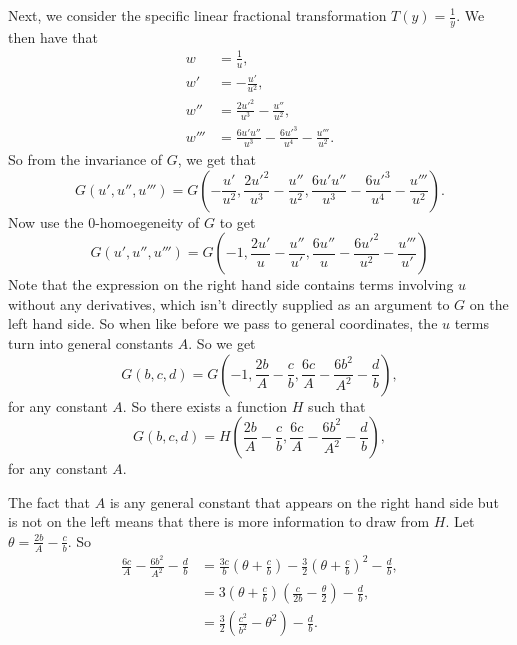 Next, we consider the specific linear fractional transformation \(T(y) = \frac{1}{y}\). We then have that
\begin{align}
w & = \frac{1}{u}, \\
w' & = -\frac{u'}{u^2}, \\
w'' & = \frac{2u'^2}{u^3} - \frac{u''}{u^2}, \\
w''' & = \frac{6u'u''}{u^3} - \frac{6u'^3}{u^4} - \frac{u'''}{u^2}. 
\end{align}
So from the invariance of \(G\), we get that
\begin{equation}
G(u', u'', u''') = G\left( -\frac{u'}{u^2},
    \frac{2u'^2}{u^3} - \frac{u''}{u^2},
    \frac{6u'u''}{u^3} - \frac{6u'^3}{u^4} - \frac{u'''}{u^2} \right). 
\end{equation}
Now use the 0-homoegeneity of \(G\) to get
\begin{equation}
G(u', u'', u''') = G\left(-1, 
    \frac{2u'}{u} - \frac{u''}{u'}, 
    \frac{6u''}{u} - \frac{6u'^2}{u^2} - \frac{u'''}{u'}\right)
\end{equation}
Note that the expression on the right hand side contains terms involving \(u\) without any derivatives,
which isn't directly supplied as an argument to \(G\) on the left hand side. So when like before we
pass to general coordinates, the \(u\) terms turn into general constants \(A\). So we get
\begin{equation}
G(b, c, d) = G\left(-1, 
    \frac{2b}{A} - \frac{c}{b}, 
    \frac{6c}{A} - \frac{6b^2}{A^2} - \frac{d}{b}\right),
\end{equation} 
for any constant \(A\). So there exists a function \(H\) such that
\begin{equation}
G(b, c, d) = H\left(
    \frac{2b}{A} - \frac{c}{b}, 
    \frac{6c}{A} - \frac{6b^2}{A^2} - \frac{d}{b}\right),
\end{equation}
for any constant \(A\).

The fact that \(A\) is any general constant that appears on the right hand side but is not on the left means that 
there is more information to draw from \(H\). Let \(\theta = \frac{2b}{A} - \frac{c}{b}\). So
\begin{align}
\frac{6c}{A} - \frac{6b^2}{A^2} - \frac{d}{b} & = 
    \frac{3c}{b}\left(\theta + \frac{c}{b}\right)
    - \frac{3}{2}\left(\theta + \frac{c}{b}\right)^2 - \frac{d}{b}, \\
& = 3\left(\theta + \frac{c}{b}\right)\left(\frac{c}{2b} - \frac{\theta}{2}\right) - \frac{d}{b}, \\
& = \frac{3}{2}\left(\frac{c^2}{b^2} - \theta^2\right) - \frac{d}{b}.
\end{align}

